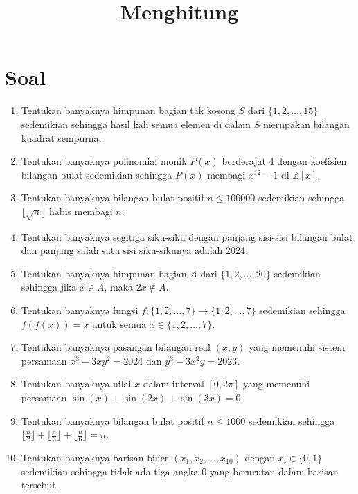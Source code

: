 \documentclass{scrartcl}
\title{Menghitung}
\begin{document}
\section*{Soal}
\begin{enumerate}

\item Tentukan banyaknya himpunan bagian tak kosong $S$ dari $\{1, 2, \dots, 15\}$ sedemikian sehingga hasil kali semua elemen di dalam $S$ merupakan bilangan kuadrat sempurna.


\item Tentukan banyaknya polinomial monik $P(x)$ berderajat 4 dengan koefisien bilangan bulat sedemikian sehingga $P(x)$ membagi $x^{12} - 1$ di $\mathbb{Z}[x]$.


\item Tentukan banyaknya bilangan bulat positif $n \le 100000$ sedemikian sehingga $\lfloor \sqrt{n} \rfloor$ habis membagi $n$.


\item Tentukan banyaknya segitiga siku-siku dengan panjang sisi-sisi bilangan bulat dan panjang salah satu sisi siku-sikunya adalah 2024.


\item Tentukan banyaknya himpunan bagian $A$ dari $\{1, 2, \dots, 20\}$ sedemikian sehingga jika $x \in A$, maka $2x \notin A$.


\item Tentukan banyaknya fungsi $f: \{1, 2, \dots, 7\} \to \{1, 2, \dots, 7\}$ sedemikian sehingga $f(f(x)) = x$ untuk semua $x \in \{1, 2, \dots, 7\}$.


\item Tentukan banyaknya pasangan bilangan real $(x,y)$ yang memenuhi sistem persamaan $x^3 - 3xy^2 = 2024$ dan $y^3 - 3x^2y = 2023$.


\item Tentukan banyaknya nilai $x$ dalam interval $[0, 2\pi]$ yang memenuhi persamaan $\sin(x) + \sin(2x) + \sin(3x) = 0$.


\item Tentukan banyaknya bilangan bulat positif $n \le 1000$ sedemikian sehingga $\lfloor \frac{n}{2} \rfloor + \lfloor \frac{n}{3} \rfloor + \lfloor \frac{n}{6} \rfloor = n$.


\item Tentukan banyaknya barisan biner $(x_1, x_2, \dots, x_{10})$ dengan $x_i \in \{0, 1\}$ sedemikian sehingga tidak ada tiga angka 0 yang berurutan dalam barisan tersebut.
\end{enumerate}
\end{document}
